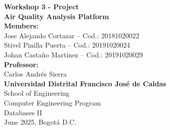 \documentclass[12pt]{article}
\begin{document}
\begin{titlepage}
    \centering
    \vspace*{1cm}
    
    \Huge
    \textbf{Workshop 3 - Project}\\[0.5cm]
    
    \LARGE
    \textbf{Air Quality Analysis Platform}\\[2cm]
    
    \Large
    \textbf{Members:}\\[0.5cm]
    Jose Alejando Cortazar – Cod.: 20181020022\\
    Stivel Pinilla Puerta – Cod.: 20191020024\\
    Johan Castaño Martinez – Cod.: 20191020029\\[2cm]
    
    \textbf{Professor:}\\[0.5cm]
    Carlos Andrés Sierra\\[2cm]
    
    \textbf{Universidad Distrital Francisco José de Caldas}\\
    School of Engineering\\
    Computer Engineering Program\\
    Databases II\\[2cm]
    
    June 2025, Bogotá D.C.
\end{titlepage}

\newpage

\tableofcontents
\newpage






% 
% 
% 
% 
% 
% 


\end{document}
